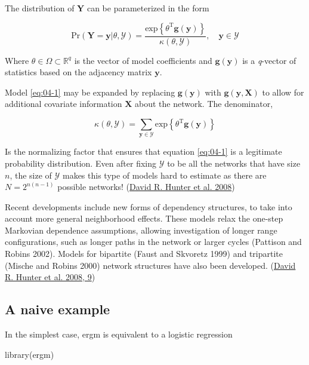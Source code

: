 \documentclass[
]{book}
\newenvironment{Shaded}{\begin{snugshade}}{\end{snugshade}}
\newcommand{\FunctionTok}[1]{\textcolor[rgb]{0.00,0.00,0.00}{#1}}
\newcommand{\NormalTok}[1]{#1}
\begin{document}
The distribution of \(\mathbf{Y}\) can be parameterized in the form

\[
\mbox{Pr}\left(\mathbf{Y}=\mathbf{y}|\theta, \mathcal{Y}\right) = \frac{\mbox{exp}\left\{\theta^{\mbox{T}}\mathbf{g}(\mathbf{y})\right\}}{\kappa\left(\theta, \mathcal{Y}\right)},\quad\mathbf{y}\in\mathcal{Y}
\label{eq:04-1}
\]

Where \(\theta\in\Omega\subset\mathbb{R}^q\) is the vector of model coefficients and \(\mathbf{g}(\mathbf{y})\) is a \emph{q}-vector of statistics based on the adjacency matrix \(\mathbf{y}\).

Model \eqref{eq:04-1} may be expanded by replacing \(\mathbf{g}(\mathbf{y})\) with \(\mathbf{g}(\mathbf{y}, \mathbf{X})\) to allow for additional covariate information \(\mathbf{X}\) about the network. The denominator,

\[
\kappa\left(\theta,\mathcal{Y}\right) = \sum_{\mathbf{y}\in\mathcal{Y}}\mbox{exp}\left\{\theta^{\mbox{T}}\mathbf{g}(\mathbf{y})\right\}
\]

Is the normalizing factor that ensures that equation \eqref{eq:04-1} is a legitimate probability distribution. Even after fixing \(\mathcal{Y}\) to be all the networks that have size \(n\), the size of \(\mathcal{Y}\) makes this type of models hard to estimate as there are \(N = 2^{n(n-1)}\) possible networks! (\protect\hyperlink{ref-Hunter2008}{David R. Hunter et al. 2008})

Recent developments include new forms of dependency structures, to take into account more general neighborhood effects. These models relax the one-step Markovian dependence assumptions, allowing investigation of longer range configurations, such as longer paths in the network or larger cycles (Pattison and Robins 2002). Models for bipartite (Faust and Skvoretz 1999) and tripartite (Mische and Robins 2000) network structures have also been developed. (\protect\hyperlink{ref-Hunter2008}{David R. Hunter et al. 2008, 9})

\hypertarget{a-naive-example}{%
\subsection{A naive example}\label{a-naive-example}}

In the simplest case, ergm is equivalent to a logistic regression

\begin{Shaded}
\begin{Highlighting}[]
\FunctionTok{library}\NormalTok{(ergm)}
\end{Highlighting}
\end{Shaded}
\end{document}
